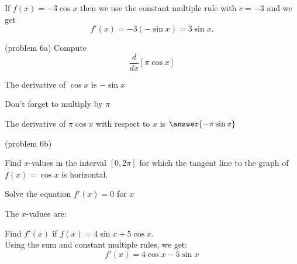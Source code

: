 \documentclass[handout]{ximera}
\begin{document}
\begin{example}[example 6]
 If $f(x) = -3\cos x$ then we use the constant multiple rule with $c = -3$ and we get 
\[
f'(x) = -3(-\sin x) = 3\sin x.
\]
\end{example}



\begin{problem}(problem 6a)
  Compute 
  \[
  \frac{d}{dx} \left[\pi\cos x\right]
  \]
  
    \begin{hint}
      The derivative of $\cos x$ is $-\sin x$
    \end{hint}
		\begin{hint}
		  Don't forget to multiply by $\pi$
		\end{hint}
		
		The derivative of $\pi\cos x$ with respect to $x$ is
		 $\answer{-\pi\sin x}$
	
\end{problem}



\begin{problem}(problem 6b)

Find $x$-values in the interval $[0, 2\pi]$ for which the tangent line to the 
graph of $f(x) = \cos x$ is horizontal.


\begin{hint}
Solve the equation $f'(x) = 0$ for $x$
\end{hint}

The $x$-values are:
\begin{multipleChoice}
  \choice{$-\pi,0 \pi$}
\end{multipleChoice}

\end{problem}



\begin{foldable}
\end{foldable}


\begin{example}[example 7]
 Find $f'(x)$ if $f(x) = 4\sin x + 5\cos x.$ \\
 Using the sum and constant multiple rules, we get: 
\[
f'(x) = 4\cos x - 5\sin x
\]
\end{example}
\end{document}
